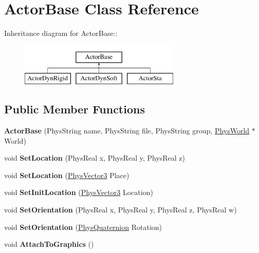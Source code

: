 \hypertarget{classActorBase}{
\section{ActorBase Class Reference}
\label{dd/d7b/classActorBase}
}
Inheritance diagram for ActorBase::\begin{figure}[H]
\begin{center}
\leavevmode
\includegraphics[height=2cm]{dd/d7b/classActorBase}
\end{center}
\end{figure}
\subsection*{Public Member Functions}
\begin{DoxyCompactItemize}
\item 
\hypertarget{classActorBase_a673d963aa7a99475cb03250c010dfa15}{
{\bfseries ActorBase} (PhysString name, PhysString file, PhysString group, \hyperlink{classPhysWorld}{PhysWorld} $\ast$World)}
\label{dd/d7b/classActorBase_a673d963aa7a99475cb03250c010dfa15}

\item 
\hypertarget{classActorBase_a34848d620c5d9d2796999edbdcb77c9a}{
void {\bfseries SetLocation} (PhysReal x, PhysReal y, PhysReal z)}
\label{dd/d7b/classActorBase_a34848d620c5d9d2796999edbdcb77c9a}

\item 
\hypertarget{classActorBase_a2a204add0b036de441ebd59d14939000}{
void {\bfseries SetLocation} (\hyperlink{classPhysVector3}{PhysVector3} Place)}
\label{dd/d7b/classActorBase_a2a204add0b036de441ebd59d14939000}

\item 
\hypertarget{classActorBase_ac118fc21f89d067d987d511b444f7d55}{
void {\bfseries SetInitLocation} (\hyperlink{classPhysVector3}{PhysVector3} Location)}
\label{dd/d7b/classActorBase_ac118fc21f89d067d987d511b444f7d55}

\item 
\hypertarget{classActorBase_a9777506815a9840552b30c65d5d70f8d}{
void {\bfseries SetOrientation} (PhysReal x, PhysReal y, PhysReal z, PhysReal w)}
\label{dd/d7b/classActorBase_a9777506815a9840552b30c65d5d70f8d}

\item 
\hypertarget{classActorBase_a5fe558ca0a88061615cda52a4dc5bf66}{
void {\bfseries SetOrientation} (\hyperlink{classPhysQuaternion}{PhysQuaternion} Rotation)}
\label{dd/d7b/classActorBase_a5fe558ca0a88061615cda52a4dc5bf66}

\item 
\hypertarget{classActorBase_afab604970fede16ccde0c6b8e72d9ee0}{
void {\bfseries AttachToGraphics} ()}
\label{dd/d7b/classActorBase_afab604970fede16ccde0c6b8e72d9ee0}

\end{DoxyCompactItemize}
